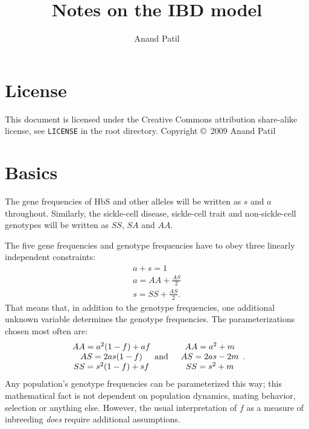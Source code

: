 \documentclass[a4paper]{article}
\begin{document}
\title{Notes on the IBD model}
\author{Anand Patil}
\maketitle

\section{License} %
\label{sec:license}
This document is licensed under the Creative Commons attribution share-alike license, see \texttt{LICENSE} in the root directory. Copyright \copyright\ 2009 Anand Patil

\section{Basics} %
\label{sec:basics}

The gene frequencies of HbS and other alleles will be written as $s$ and $a$ throughout. Similarly, the sickle-cell disease, sickle-cell trait and non-sickle-cell genotypes will be written as $SS$, $SA$ and $AA$.


The five gene frequencies and genotype frequencies have to obey three linearly independent constraints:
\begin{eqnarray*}
    a+s=1\\
    a=AA+\frac{AS}{2}\\
    s=SS+\frac{AS}{2}.
\end{eqnarray*}
That means that, in addition to the genotype frequencies, one additional unknown variable determines the genotype frequencies. The parameterizations chosen most often are:
\begin{eqnarray*}
\begin{array}{c}AA=a^2(1-f)+af\\AS=2as(1-f)\\SS=s^2(1-f)+sf\end{array} &\textup{and}&
\begin{array}{c}AA=a^2+m\\AS=2as-2m\\SS=s^2+m\end{array}.
\end{eqnarray*}
Any population's genotype frequencies can be parameterized this way; this mathematical fact is not dependent on population dynamics, mating behavior, selection or anything else. However, the usual interpretation of $f$ as a measure of inbreeding \emph{does} require additional assumptions. 
\end{document}
